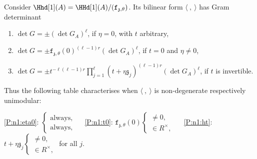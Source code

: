 \documentclass[a4paper,11pt]{amsart}
\let\<\langle
\let\>\rangle
\numberwithin{equation}{subsection}
\theoremstyle{definition}
\theoremstyle{theorem}
\theoremstyle{remark}
\newcommand\charge{{\mathfrak{z}}}
\newcommand\kapp{{\mathfrak{z}}}
\newcommand\fct{\mathtt{f}_{\charge,\theta}}
\begin{document}
\begin{Theorem}\label{P:n1}
Consider $\Hhd[1](A)=\HHd[1](A)/(\fct)$. Its bilinear form $\<\ ,\ \>$ has Gram determinant
  \begin{enumerate}
  \item\label{P:n1:eta0}
    $\det G=\pm(\det G_A)^{\ell}$, if $\eta=0$, with $t$ arbitrary,
  \item\label{P:n1:t0}
    $\det G=\pm\fct(0)^{(\ell-1){r}}(\det G_A)^{\ell}$, if $t=0$ and $\eta\not=0$,
  \item\label{P:n1:ht}
    $\det G=\pm t^{-\ell(\ell-1)r}\prod_{j=1}^{\ell}(t+\eta\kapp_j)^{(\ell-1)r}(\det G_A)^{\ell}$, if $t$ is invertible.
      \end{enumerate}
  Thus the following table  characterises when $\<\ ,\ \>$ is non-degenerate respectively  unimodular:
    \begin{center}
  \autoref{P:n1:eta0}: $\begin{cases}
   \text{always}, \\ \text{always},
   \end{cases}\quad$
   \autoref{P:n1:t0}:
    $ \fct(0)
    \begin{cases}
  \not=0,\\
  \in R^{\times},
  \end{cases}\quad$
  \autoref{P:n1:ht}:
   $t+\eta\kapp_j
   \begin{cases}
   \not=0,\\
  \in R^{\times},
\end{cases}$ for all $j$.
  \end{center}


\end{Theorem}
\end{document}
